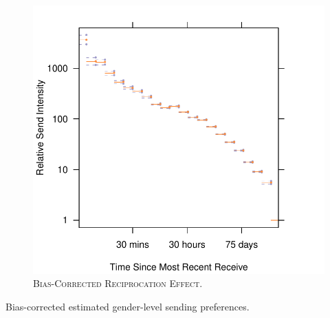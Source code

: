 \documentclass[aoas,preprint]{imsart}
\begin{document}
\begin{figure}[h]
    \includegraphics[scale=0.6]{figures/reciprocation-bc}
    \caption{
        \textsc{Bias-Corrected Reciprocation Effect.}
    }\label{F:reciprocation-bc}
\end{figure}

\begin{table}[h]
    
    \label{T:gender-effects-dynamic-bc}    
    \caption{
        Bias-corrected estimated gender-level sending preferences.
    }
\end{table}



\end{document}
